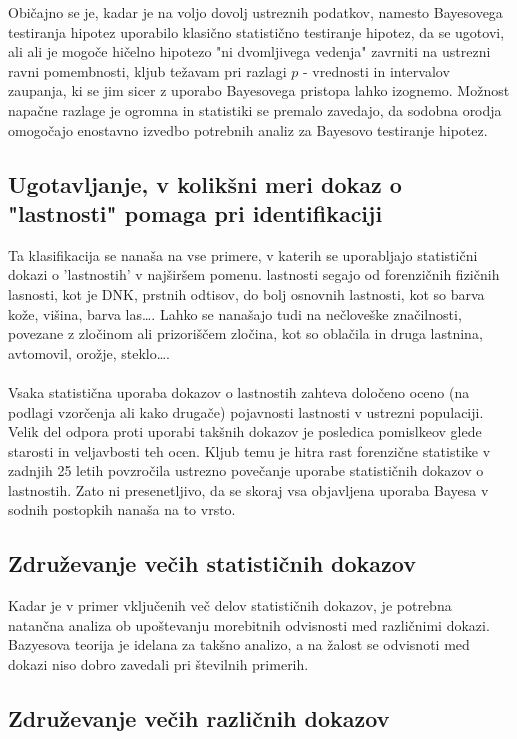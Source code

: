 \documentclass[a4paper,12pt]{article}
\begin{document}
Običajno se je, kadar je na voljo dovolj ustreznih podatkov, namesto Bayesovega testiranja hipotez uporabilo klasično statistično testiranje 
hipotez, da se ugotovi, ali ali je mogoče hičelno hipotezo "ni dvomljivega vedenja" zavrniti na ustrezni ravni pomembnosti, kljub težavam 
pri razlagi $p$ - vrednosti in intervalov zaupanja, ki se jim sicer z uporabo Bayesovega pristopa lahko izognemo. Možnost napačne 
razlage je ogromna in statistiki se premalo zavedajo, da sodobna orodja omogočajo enostavno izvedbo potrebnih analiz za Bayesovo 
testiranje hipotez.

\subsection{Ugotavljanje, v kolikšni meri dokaz o "lastnosti" pomaga pri identifikaciji}
Ta klasifikacija se nanaša na vse primere, v katerih se uporabljajo statistični dokazi o 'lastnostih' v najširšem pomenu. lastnosti segajo 
od forenzičnih fizičnih lasnosti, kot je DNK, prstnih odtisov, do bolj osnovnih lastnosti, kot so barva kože, višina, barva las\dots. 
Lahko se nanašajo tudi na nečloveške značilnosti, povezane z zločinom ali prizoriščem zločina, kot so oblačila in druga lastnina, 
avtomovil, orožje, steklo\dots. \\ \\

Vsaka statistična uporaba dokazov o lastnostih zahteva določeno oceno (na podlagi vzorčenja ali kako drugače) pojavnosti lastnosti v 
ustrezni populaciji. Velik del odpora proti uporabi takšnih dokazov je posledica pomislkeov glede starosti in veljavbosti teh ocen. Kljub 
temu je hitra rast forenzične statistike v zadnjih 25 letih povzročila ustrezno povečanje uporabe statističnih dokazov o lastnostih. Zato 
ni presenetljivo, da se skoraj vsa objavljena uporaba Bayesa v sodnih postopkih nanaša na to vrsto.

\subsection{Združevanje večih statističnih dokazov}
Kadar je v primer vključenih več delov statističnih dokazov, je potrebna natančna analiza ob upoštevanju morebitnih odvisnosti med 
različnimi dokazi. Bazyesova teorija je idelana za takšno analizo, a na žalost se odvisnoti med dokazi niso dobro zavedali pri 
številnih primerih. 

\subsection{Združevanje večih različnih dokazov}
\end{document}
